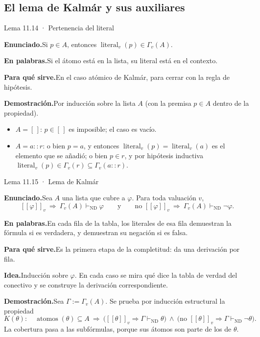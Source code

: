\documentclass[11pt,a4paper]{article}
\newcommand{\campo}[1]{\par\smallskip\noindent\textbf{#1}\enspace}
\newcommand{\enunciado}{\campo{Enunciado.}}
\newcommand{\palabras}{\campo{En palabras.}}
\newcommand{\sirve}{\campo{Para qué sirve.}}
\newcommand{\idea}{\campo{Idea.}}
\newcommand{\prueba}{\campo{Demostración.}}
\newcommand{\Provnd}{\vdash_{\mathrm{ND}}}
\newcommand{\Not}{\neg}
\newcommand{\sem}[1]{[\![#1]\!]}
\newcommand{\atomos}{\operatorname{atomos}}
\newcommand{\lit}{\operatorname{literal}}
\begin{document}
\subsection{El lema de Kalmár y sus auxiliares}

\begin{resultado}{Lema 11.14 · Pertenencia del literal}
\enunciado Si \(p\in A\), entonces \(\lit_v(p)\in\Gamma_v(A)\).

\palabras Si el átomo está en la lista, su literal está en el contexto.

\sirve En el caso atómico de Kalmár, para cerrar con la regla de hipótesis.

\prueba Por inducción sobre la lista \(A\) (con la premisa \(p\in A\) dentro
de la propiedad).
\begin{itemize}
  \item \(A=[\,]\): \(p\in[\,]\) es imposible; el caso es vacío.
  \item \(A=a::r\): o bien \(p=a\), y entonces \(\lit_v(p)=\lit_v(a)\) es el
    elemento que se añadió; o bien \(p\in r\), y por hipótesis inductiva
    \(\lit_v(p)\in\Gamma_v(r)\subseteq\Gamma_v(a::r)\).
\end{itemize}
\end{resultado}

\begin{resultado}{Lema 11.15 · Lema de Kalmár}
\enunciado Sea \(A\) una lista que cubre a \(\varphi\). Para toda valuación
\(v\),
\[
\sem\varphi_v\ \Rightarrow\ \Gamma_v(A)\Provnd\varphi
\qquad\text{y}\qquad
\text{no }\sem\varphi_v\ \Rightarrow\ \Gamma_v(A)\Provnd\Not\varphi .
\]

\palabras En cada fila de la tabla, los literales de esa fila demuestran la
fórmula si es verdadera, y demuestran su negación si es falsa.

\sirve Es la primera etapa de la completitud: da una derivación por fila.

\idea Inducción sobre \(\varphi\). En cada caso se mira qué dice la tabla de
verdad del conectivo y se construye la derivación correspondiente.

\prueba Sea \(\Gamma:=\Gamma_v(A)\). Se prueba por inducción estructural la
propiedad
\[
K(\theta):\quad \atomos(\theta)\subseteq A\ \Rightarrow\
\big(\sem\theta_v\Rightarrow\Gamma\Provnd\theta\big)\ \wedge\
\big(\text{no }\sem\theta_v\Rightarrow\Gamma\Provnd\Not\theta\big).
\]
La cobertura pasa a las subfórmulas, porque sus átomos son parte de los de
\(\theta\).
\end{resultado}
\end{document}

